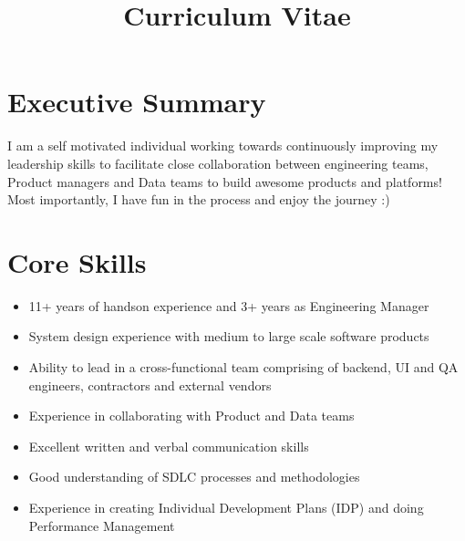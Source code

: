 \documentclass[11pt,a4paper,sans]{moderncv} %
\title{Curriculum Vitae}
\begin{document}
\makecvtitle %

\section{Executive Summary}
I am a self motivated individual working towards continuously improving my leadership skills to facilitate close collaboration between engineering teams, Product managers and Data teams to build awesome products and platforms! Most importantly, I have fun in the process and enjoy the journey :)

\section{Core Skills}
\begin{multicols}{2}
    \begin{itemize}
        \item 11+ years of handson experience and 3+ years as Engineering Manager
        \item System design experience with medium to large scale software products
        \item Ability to lead in a cross-functional team comprising of backend, UI and QA engineers, contractors and external vendors
        \item Experience in collaborating with Product and Data teams
        \item Excellent written and verbal communication skills
        \item Good understanding of SDLC processes and methodologies
        \item Experience in creating Individual Development Plans (IDP) and doing Performance Management
    \end{itemize}
\end{multicols}

\end{document}
